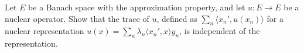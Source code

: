 Let $E$ be a Banach space with the approximation property, and let $u: E \rightarrow E$ be a nuclear operator. Show that the trace of $u$, defined as $\sum_{n} \langle x_n', u(x_n) \rangle$ for a nuclear representation $u(x) = \sum_n \lambda_n \langle x_n', x \rangle y_n$, is independent of the representation.
